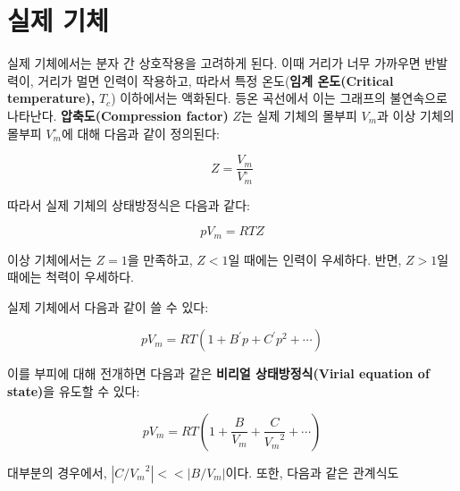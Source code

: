         \section{실제 기체}
            \hspace{\parindent} 실제 기체에서는 분자 간 상호작용을 고려하게 된다. 이때 거리가 너무 가까우면 반발력이, 거리가 멀면 인력이 작용하고, 따라서 
            특정 온도(\textbf{임계 온도(Critical temperature), }$T_c$) 이하에서는 액화된다. 등온 곡선에서 이는 그래프의 불연속으로 
            나타난다. \textbf{압축도(Compression factor)} $Z$는 실제 기체의 몰부피 $V_m$과 이상 기체의 몰부피 $V_m^\circ$에 대해 
            다음과 같이 정의된다:
            \begin{defn}[압축도]
                \begin{equation*}
                    Z = \frac{V_m}{V_m^{\circ}}
                \end{equation*}
            \end{defn}
            따라서 실제 기체의 상태방정식은 다음과 같다:
            \begin{obs}
                \begin{equation*}
                    pV_m = RTZ
                \end{equation*}
            \end{obs}
            이상 기체에서는 $Z = 1$을 만족하고, $Z < 1$일 때에는 인력이 우세하다. 반면, $Z > 1$일 때에는 척력이 우세하다.
            \par 실제 기체에서 다음과 같이 쓸 수 있다:
            \begin{obs}
                \begin{equation*}
                    pV_m = RT \left(1 + B^{\prime} p + C^{\prime} p^2 + \cdots \right)
                \end{equation*}
            \end{obs}
            이를 부피에 대해 전개하면 다음과 같은 \textbf{비리얼 상태방정식(Virial equation of state)}을 유도할 수 있다:
            \begin{obs}
                \begin{equation*}
                    pV_m = RT \left( 1 + \frac{B}{V_m} + \frac{C}{{V_m}^2} + \cdots \right)
                \end{equation*}
            \end{obs}
            대부분의 경우에서, $\left\vert C / {V_m}^2 \right\vert << \left\vert B / V_m \right\vert$이다. 또한, 다음과 같은 관계식도 
